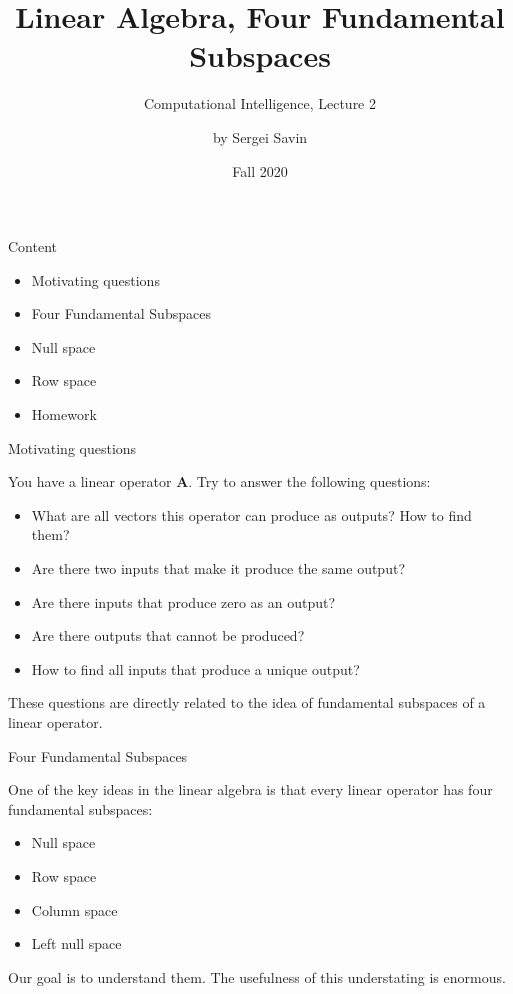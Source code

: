 \documentclass{beamer}
\title{Linear Algebra, Four Fundamental Subspaces}
\subtitle{Computational Intelligence, Lecture 2}
\author{by Sergei Savin}
\date{Fall 2020}
\begin{document}
\maketitle


\begin{frame}{Content}

\begin{itemize}
\item Motivating questions
\item Four Fundamental Subspaces
\item Null space
\item Row space
\item Homework
\end{itemize}

\end{frame}

\begin{frame}{Motivating questions}
\begin{flushleft}

You have a linear operator $\mathbf A$. Try to answer the following questions:

\begin{itemize}
    \item What are all vectors this operator can produce as outputs? How to find them?
    \item Are there two inputs that make it produce the same output?
    \item Are there inputs that produce zero as an output?
    \item Are there outputs that cannot be produced? 
    \item How to find all inputs that produce a unique output? 
\end{itemize}

These questions are directly related to the idea of fundamental subspaces of a linear operator.

\end{flushleft}
\end{frame}


\begin{frame}{Four Fundamental Subspaces}
\begin{flushleft}

One of the key ideas in the linear algebra is that every linear operator has four fundamental subspaces:

\begin{itemize}
    \item Null space
    \item Row space
    \item Column space
    \item Left null space
\end{itemize}

\bigskip

Our goal is to understand them. The usefulness of this understating is enormous.

\end{flushleft}
\end{frame}
\end{document}

